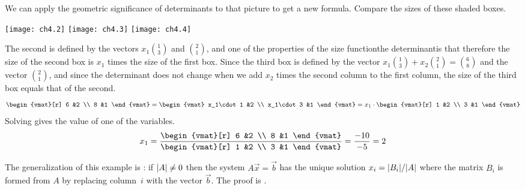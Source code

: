 We can apply the geometric significance of determinants
to that picture to get a new formula.
Compare the sizes of these shaded boxes.
\begin{center}
   \texttt{[image: ch4.2]}
   \hfil
   \texttt{[image: ch4.3]}
   \hfil
   \texttt{[image: ch4.4]}
\end{center}
The second is defined by the vectors $x_1\binom{1}{3}$ and $\binom{2}{1}$, and
one of the properties of the size function\Dash the determinant\Dash is 
that therefore the size of the second box is \( x_1 \) times the size of the 
first box.
Since the third box is defined by the vector
$x_1\binom{1}{3}+x_2\binom{2}{1}=\binom{6}{8}$ 
and the vector $\binom{2}{1}$,
and since the determinant does not change when we  add $x_2$ 
times the second column to the first column,
the size of the third box equals that of the second.
\begin{equation*}
  \begin{vmat}[r]
     6  &2  \\
     8  &1
  \end{vmat}
  =
  \begin{vmat}
     x_1\cdot 1  &2  \\
     x_1\cdot 3  &1
  \end{vmat}
  =
  x_1\cdot \begin{vmat}[r]
     1  &2  \\
     3  &1
  \end{vmat}
\end{equation*}
Solving gives the value of one of the variables.
\begin{equation*}
  x_1=
  \frac{\begin{vmat}[r]
     6  &2  \\
     8  &1
  \end{vmat} }{
  \begin{vmat}[r]
     1  &2  \\
     3  &1
  \end{vmat}  }
  =\frac{-10}{-5}=2
\end{equation*}

The generalization of this example is :%
%
if \( \deter{A}\neq 0 \) then the system \( A\vec{x}=\vec{b} \) has the
unique solution
$
   x_i=\deter{B_i}/\deter{A}
$
where the matrix $B_i$ is formed from $A$ by replacing column~$i$ 
with the vector \( \vec{b} \).
The proof is .

